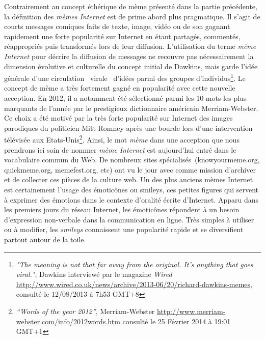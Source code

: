 Contrairement au concept éthérique de mème présenté dans la partie précédente, la définition des \textit{mèmes Internet }est de prime abord plus pragmatique. Il s{\textquoteright}agit de courts messages comiques faits de texte, image, vidéo ou de son gagnant rapidement une forte popularité sur Internet en étant partagés, commentés, réappropriés puis transformés lors de leur diffusion. L{\textquoteright}utilisation du terme \textit{mème Internet }pour décrire la diffusion de messages ne recouvre pas nécessairement la dimension évolutive et culturelle du concept initial de Dawkins, mais garde l{\textquoteright}idée générale d{\textquoteright}une circulation {\guillemotleft}~virale~{\guillemotright} d{\textquoteright}idées parmi des groupes d{\textquoteright}individus\footnote{ \textit{"The meaning is not that far away from the original. It's anything that goes viral."}, Dawkins interviewé par le magazine \textit{Wired} \url{http://www.wired.co.uk/news/archive/2013-06/20/richard-dawkins-memes}, consulté le 12/08/2013 à 7h53 GMT+8}. Le concept de mème a très fortement gagné en popularité avec cette nouvelle acception. En 2012, il a notamment été sélectionné parmi les 10 mots les plus marquants de l{\textquoteright}année par le prestigieux dictionnaire américain Merriam-Webster. Ce choix a été motivé par la très forte popularité sur Internet des images parodiques du politicien Mitt Romney après une bourde lors d{\textquoteright}une intervention télévisée aux Etats-Unis\footnote{ \textit{{\textquotedblleft}Words of the year 2012{\textquotedblright}}, Merriam-Webster \url{http://www.merriam-webster.com/info/2012words.htm} consulté le 25 Février 2014 à 19:01 GMT+1}. Ainsi, le mot \textit{mème }dans une acception que nous prendrons ici soin de nommer \textit{mème} \textit{Internet} est aujourd{\textquoteright}hui entré dans le vocabulaire commun du Web. De nombreux sites spécialisés~(knowyourmeme.org, quickmeme.org, memefest.org, etc) ont vu le jour avec comme mission d{\textquoteright}archiver et de collecter ces pièces de la culture web. Un des plus anciens mèmes Internet est certainement l{\textquoteright}usage des émoticônes ou smileys, ces petites figures qui servent à exprimer des émotions dans le contexte d{\textquoteright}oralité écrite d{\textquoteright}Internet. Apparu dans les premiers jours du réseau Internet, les émoticônes répondent à un besoin d{\textquoteright}expression non-verbale dans la communication en ligne. Très simples à utiliser ou à modifier, les \textit{smileys} connaissent une popularité rapide et se diversifient partout autour de la toile.  

